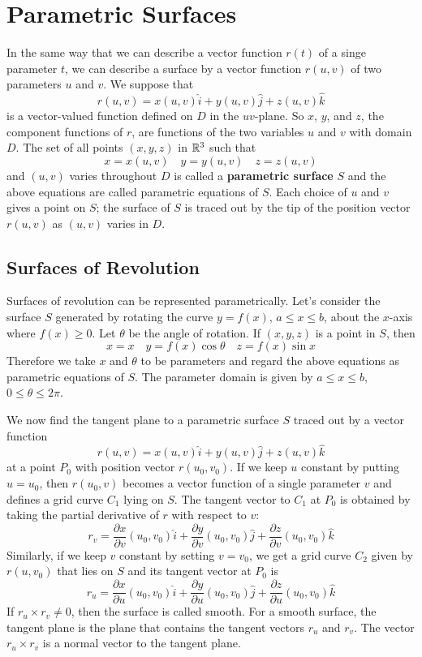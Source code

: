 \section{Parametric Surfaces}

In the same way that we can describe a vector function $r(t)$ of a singe parameter $t$, we can describe a surface by a vector function $r(u,v)$ of two parameters $u$ and $v$. We suppose that $$r(u,v) = x(u,v)\hat{i} + y(u,v)\hat{j} + z(u,v)\hat{k}$$ is a vector-valued function defined on $D$ in the $uv$-plane. So $x$, $y$, and $z$, the component functions of $r$, are functions of the two variables $u$ and $v$ with domain $D$. The set of all points $(x,y,z)$ in $\mathbb{R}^3$ such that $$x = x(u,v) \quad y = y(u,v) \quad z = z(u,v)$$ and $(u,v)$ varies throughout $D$ is called a \textbf{parametric surface} $S$ and the above equations are called parametric equations of $S$. Each choice of $u$ and $v$ gives a point on $S$; the surface of $S$ is traced out by the tip of the position vector $r(u,v)$ as $(u,v)$ varies in $D$.

\subsection{Surfaces of Revolution}

Surfaces of revolution can be represented parametrically. Let's consider the surface $S$ generated by rotating the curve $y = f(x)$, $a \leq x \leq b$, about the $x$-axis where $f(x) \geq 0$. Let $\theta$ be the angle of rotation. If $(x,y,z)$ is a point in $S$, then $$x=x \quad y = f(x)\cos{\theta} \quad z=f(x)\sin{x}$$ Therefore we take $x$ and $\theta$ to be parameters and regard the above equations as parametric equations of $S$. The parameter domain is given by $a \leq x \leq b$, $0 \leq \theta \leq 2\pi$.

We now find the tangent plane to a parametric surface $S$ traced out by a vector function $$r(u,v) = x(u,v)\hat{i} + y(u,v)\hat{j} + z(u,v)\hat{k}$$ at a point $P_0$ with position vector $r(u_0, v_0)$. If we keep $u$ constant by putting $u = u_0$, then $r(u_0, v)$ becomes a vector function of a single parameter $v$ and defines a grid curve $C_1$ lying on $S$. The tangent vector to $C_1$ at $P_0$ is obtained by taking the partial derivative of $r$ with respect to $v$: $$r_v = \frac{\partial x}{\partial v}(u_0, v_0)\hat{i} + \frac{\partial y}{\partial v}(u_0, v_0)\hat{j} + \frac{\partial z}{\partial v}(u_0, v_0)\hat{k} $$ Similarly, if we keep $v$ constant by setting $v = v_0$, we get a grid curve $C_2$ given by $r(u, v_0)$ that lies on $S$ and its tangent vector at $P_0$ is $$r_u = \frac{\partial x}{\partial u}(u_0, v_0)\hat{i} + \frac{\partial y}{\partial u}(u_0, v_0)\hat{j} + \frac{\partial z}{\partial u}(u_0, v_0)\hat{k}$$ If $r_u \times r_v \neq 0$, then the surface is called smooth. For a smooth surface, the tangent plane is the plane that contains the tangent vectors $r_u$ and $r_v$. The vector $r_u \times r_v$ is a normal vector to the tangent plane.

